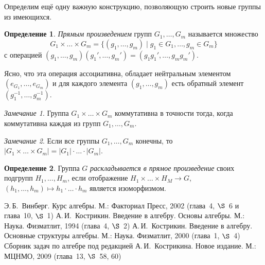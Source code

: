 \documentclass[a4paper,10pt]{amsart}
\theoremstyle{definition}
\newtheorem{definition}{Определение}
\theoremstyle{remark}
\newtheorem{remark}{Замечание}
\begin{document}
Определим ещё одну важную конструкцию, позволяющую строить новые
группы из имеющихся.

\begin{definition}
{\it Прямым произведением} групп $G_1, \ldots, G_m$ называется
множество
$$
G_1\times\ldots\times G_m=\{(g_1,\ldots,g_m) \mid g_1\in G_1,\ldots,
g_m\in G_m\}
$$
с операцией
$(g_1,\ldots,g_m)(g_1',\ldots,g_m')=(g_1g_1',\ldots,g_mg_m')$.
\end{definition}

Ясно, что эта операция ассоциативна, обладает нейтральным элементом
$(e_{G_1},\ldots,e_{G_m})$ и для каждого элемента $(g_1,\ldots,g_m)$
есть обратный элемент $(g_1^{-1},\ldots,g_m^{-1})$.

\begin{remark}
Группа $G_1\times\ldots\times G_m$ коммутативна в точности тогда,
когда коммутативна каждая из групп $G_1,\ldots, G_m$.
\end{remark}

\begin{remark}
Если все группы $G_1, \ldots, G_m$ конечны, то $|G_1 \times \ldots
\times G_m| = |G_1| \cdot \ldots \cdot |G_m|$.
\end{remark}

\begin{definition}
Группа $G$ \textit{раскладывается в прямое произведение} своих подгрупп $H_1, \ldots, H_m$, если отображение $H_1 \times \ldots \times H_M \rightarrow G$, $(h_1, \ldots, h_m) \mapsto h_1 \cdot \ldots \cdot h_m$ является изоморфизмом.
\end{definition}


\bigskip

\begin{thebibliography}{99}
Э.\,Б.~Винберг. Курс алгебры. М.: Факториал Пресс, 2002 (глава~4,
$\S$~6 и глава~10, $\S$~1)
А.\,И.~Кострикин. Введение в алгебру. Основы алгебры. М.: Наука.
Физматлит, 1994 (глава~4, $\S$~2)
А.\,И.~Кострикин. Введение в алгебру. Основные структуры алгебры.
М.: Наука. Физматлит, 2000 (глава~1, $\S$~4)
Сборник задач по алгебре под редакцией А.\,И.~Кострикина. Новое
издание. М.: МЦНМО, 2009 (глава~13, $\S$~58, 60)
\end{thebibliography}
\end{document}
